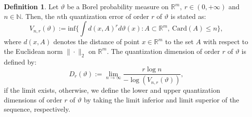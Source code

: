 \documentclass{amsproc}
\theoremstyle{definition}
\newtheorem{definition}[theorem]{Definition}
\theoremstyle{remark}
\numberwithin{equation}{section}
\begin{document}
\begin{definition}\cite{GL1}
    Let $\vartheta$ be a Borel probability measure on $\mathbb{R}^m,~r \in (0, +\infty)$ and $n \in \mathbb{N}.$  Then, the $n$th quantization error of order $r$ of $\vartheta$ is stated as:
    \[V_{n, r}(\vartheta):=\text{inf} \Big\{\int d(x, A)^r d\vartheta(x): A \subset \mathbb{R}^m, \ \text{Card}(A) \leq n\Big\},\]
    where $d(x,A)$ denotes the distance of point $x \in \mathbb{R}^m$ to the set $A$ with respect to the Euclidean norm $\|\cdot\|_2$ on $\mathbb{R}^m.$
    The quantization dimension of order $r$ of $\vartheta$ is defined by:
    $$ D_r(\vartheta):= \lim_{n\to \infty} \frac{r \log n}{- \log(V_{n,r}(\vartheta))},$$
    if the limit exists, otherwise, we define the lower and upper quantization dimensions of order $r$ of $\vartheta$ by taking the limit inferior and limit superior of the sequence, respectively.
\end{definition}
\end{document}
